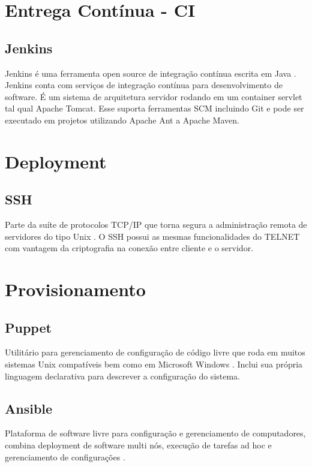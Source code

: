     \section{Entrega Contínua - CI}
	\subsection{Jenkins} Jenkins é uma ferramenta open source de
	integração contínua escrita em Java \cite{bezerra2013integraccao}. Jenkins conta com serviços
	de integração contínua para desenvolvimento de software.
	É um sistema de arquitetura servidor rodando em um container
	servlet tal qual Apache Tomcat. Esse suporta ferramentas SCM
	incluindo Git e pode ser executado em projetos utilizando
	Apache Ant a Apache Maven.

    \section{Deployment}
	\subsection{SSH}Parte da suíte de protocolos TCP/IP que torna
	segura a administração remota de servidores do tipo Unix \cite{lehtinen2006secure}. O SSH
	possui as mesmas funcionalidades do TELNET com vantagem da
	criptografia na conexão entre cliente e o servidor.

    \section{Provisionamento}

	\subsection{Puppet} Utilitário para gerenciamento de configuração de
	código livre que roda em muitos sistemas Unix compatíveis bem como
	em Microsoft Windows \cite{turnbull2008pulling}. Inclui sua própria linguagem declarativa para
	descrever a configuração do sistema.

	\subsection{Ansible} Plataforma de software livre para configuração e
	gerenciamento de computadores, combina deployment de software multi
	nós, execução de tarefas ad hoc e gerenciamento de configurações \cite{mohaan2014learning}.

